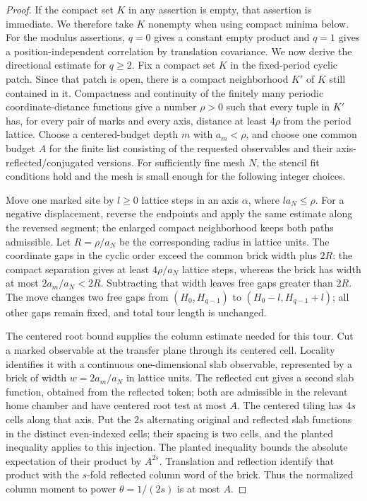 \begin{proof}
If the compact set $K$ in any assertion is empty, that assertion is immediate. We therefore take $K$ nonempty when using compact minima below. For the modulus assertions, $q=0$ gives a constant empty product and $q=1$ gives a position-independent correlation by translation covariance. We now derive the directional estimate for $q\geq2$. Fix a compact set $K$ in the fixed-period cyclic patch. Since that patch is open, there is a compact neighborhood $K'$ of $K$ still contained in it. Compactness and continuity of the finitely many periodic coordinate-distance functions give a number $\rho>0$ such that every tuple in $K'$ has, for every pair of marks and every axis, distance at least $4\rho$ from the period lattice. Choose a centered-budget depth $m$ with $a_m<\rho$, and choose one common budget $A$ for the finite list consisting of the requested observables and their axis-reflected/conjugated versions. For sufficiently fine mesh $N$, the stencil fit conditions hold and the mesh is small enough for the following integer choices.

Move one marked site by $l\geq0$ lattice steps in an axis $\alpha$, where $l a_N\leq\rho$. For a negative displacement, reverse the endpoints and apply the same estimate along the reversed segment; the enlarged compact neighborhood keeps both paths admissible. Let $R=\rho/a_N$ be the corresponding radius in lattice units. The coordinate gaps in the cyclic order exceed the common brick width plus $2R$: the compact separation gives at least $4\rho/a_N$ lattice steps, whereas the brick has width at most $2a_m/a_N<2R$. Subtracting that width leaves free gaps greater than $2R$. The move changes two free gaps from $(H_0,H_{q-1})$ to $(H_0-l,H_{q-1}+l)$; all other gaps remain fixed, and total tour length is unchanged.

The centered root bound supplies the column estimate needed for this tour. Cut a marked observable at the transfer plane through its centered cell. Locality identifies it with a continuous one-dimensional slab observable, represented by a brick of width $w=2a_m/a_N$ in lattice units. The reflected cut gives a second slab function, obtained from the reflected token; both are admissible in the relevant home chamber and have centered root test at most $A$. The centered tiling has $4s$ cells along that axis. Put the $2s$ alternating original and reflected slab functions in the distinct even-indexed cells; their spacing is two cells, and the planted inequality applies to this injection. The planted inequality bounds the absolute expectation of their product by $A^{2s}$. Translation and reflection identify that product with the $s$-fold reflected column word of the brick. Thus the normalized column moment to power $\theta=1/(2s)$ is at most $A$.


\end{proof}
